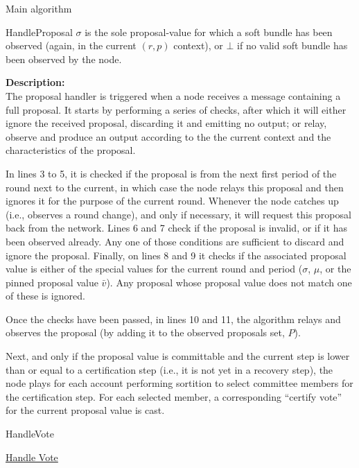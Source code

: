 \documentclass[10pt,a4paper]{article}
\begin{document}
\begin{section}{Main algorithm}
\begin{subsection}{HandleProposal}
    $\sigma$ is the sole proposal-value for which a soft bundle has been observed (again, 
    in the current $(r,p)$ context), or $\bot$ if no valid soft bundle has been observed by the 
    node.

    \noindent \textbf{Description:}\\
The proposal handler is triggered when a node receives a message containing a full proposal.
It starts by performing a series of checks, after which it will either ignore the received
proposal, discarding it and emitting no output; or relay, observe and produce an output
according to the the current context and the characteristics of the proposal.

In lines 3 to 5, it is checked if the proposal is from the next first period of the round next
to the current, in which case the node relays this proposal and then ignores it for the purpose 
of the current round. 
Whenever the node catches up (i.e., observes a round change), and only if necessary, it will request 
this proposal back from the network.
Lines 6 and 7 check if the proposal is invalid, or if it has been observed already. Any one of those
conditions are sufficient to discard and ignore the proposal.
Finally, on lines 8 and 9 it checks if the associated proposal value is either of the special values for the current
round and period ($\sigma$, $\mu$, or the pinned proposal value $\bar{v}$). Any proposal whose proposal value does not match
one of these is ignored.

Once the checks have been passed, in lines 10 and 11, the algorithm relays and observes the proposal (by adding
it to the observed proposals set, $P$). 

Next, and only if the proposal value is committable and the current step is lower than or equal
to a certification step (i.e., it is not yet in a recovery step), the node plays for each account 
performing sortition to select committee members for the certification step. 
For each selected member, a corresponding ``certify vote'' for the current proposal value is cast.


\end{subsection}


\begin{subsection}{HandleVote}\label{ssect:HandleVote}

    \begin{algorithm}[H]
        \caption{\underline{Handle Vote}}
        \label{algo:handle-vote}
        \begin{algorithmic}[1]


\end{algorithmic}
\end{algorithm}
\end{subsection}
\end{section}
\end{document}
